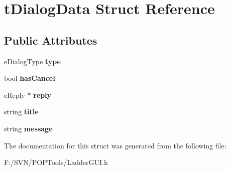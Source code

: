 \hypertarget{structt_dialog_data}{\section{t\-Dialog\-Data Struct Reference}
\label{structt_dialog_data}
}
\subsection*{Public Attributes}
\begin{DoxyCompactItemize}
\item 
\hypertarget{structt_dialog_data_a08d2e92a09d11a1da923d461ae34115a}{e\-Dialog\-Type {\bfseries type}}\label{structt_dialog_data_a08d2e92a09d11a1da923d461ae34115a}

\item 
\hypertarget{structt_dialog_data_ac3034571791921cfdbe5c08b3708c1ad}{bool {\bfseries has\-Cancel}}\label{structt_dialog_data_ac3034571791921cfdbe5c08b3708c1ad}

\item 
\hypertarget{structt_dialog_data_a14df63b3b1358f7e12df8425b681c81f}{e\-Reply $\ast$ {\bfseries reply}}\label{structt_dialog_data_a14df63b3b1358f7e12df8425b681c81f}

\item 
\hypertarget{structt_dialog_data_af5cee56a7ff8cf6d34e9ccf707667116}{string {\bfseries title}}\label{structt_dialog_data_af5cee56a7ff8cf6d34e9ccf707667116}

\item 
\hypertarget{structt_dialog_data_ab6e5ad7f735059f85b8fdeb7abb111c2}{string {\bfseries message}}\label{structt_dialog_data_ab6e5ad7f735059f85b8fdeb7abb111c2}

\end{DoxyCompactItemize}


The documentation for this struct was generated from the following file\-:\begin{DoxyCompactItemize}
\item 
F\-:/\-S\-V\-N/\-P\-O\-P\-Tools/Ladder\-G\-U\-I.\-h\end{DoxyCompactItemize}
